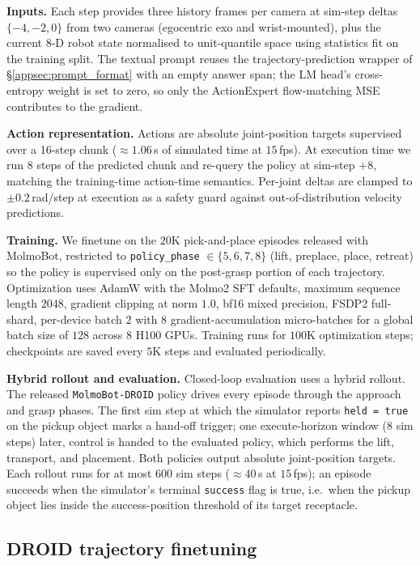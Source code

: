 \noindent\textbf{Inputs.}
Each step provides three history frames per camera at sim-step deltas
$\{-4, -2, 0\}$ from two cameras (egocentric exo and wrist-mounted), plus the
current 8-D robot state normalised to unit-quantile space using statistics
fit on the training split. The textual prompt reuses the
trajectory-prediction wrapper of \S\ref{appsec:prompt_format} with an empty
answer span; the LM head's cross-entropy weight is set to zero, so only the
ActionExpert flow-matching MSE contributes to the gradient.

\noindent\textbf{Action representation.}
Actions are absolute joint-position targets supervised over a 16-step chunk
($\approx 1.06$\,s of simulated time at $15$\,fps). At execution time we run
$8$ steps of the predicted chunk and re-query the policy at sim-step $+8$,
matching the training-time action-time semantics. Per-joint deltas are
clamped to $\pm 0.2$\,rad/step at execution as a safety guard against
out-of-distribution velocity predictions.

\noindent\textbf{Training.}
We finetune on the $20$K pick-and-place episodes released with MolmoBot,
restricted to \texttt{policy\_phase} $\in \{5, 6, 7, 8\}$ (lift, preplace,
place, retreat) so the policy is supervised only on the post-grasp portion of
each trajectory. Optimization uses AdamW with the Molmo2 SFT defaults,
maximum sequence length $2048$, gradient clipping at norm $1.0$, bf16
mixed precision, FSDP2 full-shard, per-device batch $2$ with $8$
gradient-accumulation micro-batches for a global batch size of $128$ across
$8$ H100 GPUs. Training runs for $100$K optimization steps; checkpoints are
saved every $5$K steps and evaluated periodically.

\noindent\textbf{Hybrid rollout and evaluation.}
Closed-loop evaluation uses a hybrid rollout. The released
\texttt{MolmoBot-DROID} policy drives every episode through the approach and
grasp phases. The first sim step at which the simulator reports
\texttt{held = true} on the pickup object marks a hand-off trigger; one
execute-horizon window ($8$ sim steps) later, control is handed to the
evaluated policy, which performs the lift, transport, and placement. Both
policies output absolute joint-position targets. Each rollout runs for at most
$600$ sim steps ($\approx 40$\,s at $15$\,fps); an episode succeeds when the
simulator's terminal \texttt{success} flag is true, i.e.\ when the pickup
object lies inside the success-position threshold of its target receptacle.

\subsection{DROID trajectory finetuning}
\label{appsec:droid}

